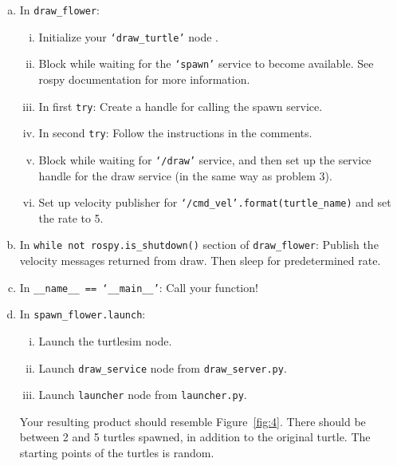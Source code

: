 \begin{enumerate}[(a)]
  \item In \texttt{draw\_flower}:
  \begin{enumerate}[i.]
    \item Initialize your \texttt{`draw\_turtle'} node
    .
    \item Block while waiting for the \texttt{`spawn'} service to become available. See rospy
    documentation for more information.

    \item In first \texttt{try}: Create a handle for calling the spawn service.
    \item In second \texttt{try}: Follow the instructions in the comments.
    \item Block while waiting for \texttt{`/draw'} service, and then set up the service handle for
    the draw service (in the same way as problem 3). %

    \item Set up velocity publisher for \texttt{`{}/cmd\_vel'.format(turtle\_name)} and set the rate to 5.
  \end{enumerate}
  
  
  
  \item In \texttt{while not rospy.is\_shutdown()} section of \texttt{draw\_flower}: Publish the
  velocity messages returned from draw. Then sleep for predetermined rate.

  \item In \texttt{\_\_name\_\_ == `\_\_main\_\_'}: Call your function!
  \item In \texttt{spawn\_flower.launch}:
  \begin{enumerate}[i.]
    \item Launch the turtlesim node.
    \item Launch \texttt{draw\_service} node from \texttt{draw\_server.py}.
    \item  Launch \texttt{launcher} node from \texttt{launcher.py}.
  \end{enumerate}

  Your resulting product should resemble Figure~\ref{fig:4}. There should be between 2 and 5 turtles
  spawned, in addition to the original turtle. The starting points of the turtles is random.


\end{enumerate}


